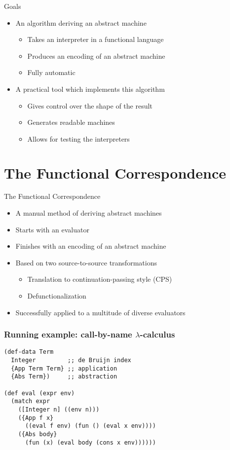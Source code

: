 \documentclass{beamer}
\newcommand{\LC}{\(\lambda\)-calculus}
\begin{document}
\begin{frame}{Goals}
  \begin{itemize}
    \item An algorithm deriving an abstract machine
    \begin{itemize}
      \item Takes an interpreter in a functional language
      \item Produces an encoding of an abstract machine
      \item Fully automatic
    \end{itemize}
    \pause
    \item A practical tool which implements this algorithm
    \begin{itemize}
      \item Gives control over the shape of the result
      \item Generates readable machines
      \item Allows for testing the interpreters
    \end{itemize}
  \end{itemize}
\end{frame}

\section{The Functional Correspondence}

\begin{frame}{The Functional Correspondence}
  \begin{itemize}
    \item A manual method of deriving abstract machines
    \item Starts with an evaluator
    \item Finishes with an encoding of an abstract machine
    \pause
    \item Based on two source-to-source transformations
    \begin{itemize}
      \item Translation to continuation-passing style (CPS)
      \item Defunctionalization
    \end{itemize}
    \pause
    \item Successfully applied to a multitude of diverse evaluators
  \end{itemize}
\end{frame}

\begin{frame}[fragile]
\frametitle{Running example: call-by-name \LC{}}
\begin{lstlisting}
(def-data Term
  Integer         ;; de Bruijn index
  {App Term Term} ;; application
  {Abs Term})     ;; abstraction

(def eval (expr env)
  (match expr
    ([Integer n] ((env n)))
    ({App f x}
      ((eval f env) (fun () (eval x env))))
    ({Abs body}
      (fun (x) (eval body (cons x env))))))
\end{lstlisting}
\end{frame}
\end{document}
